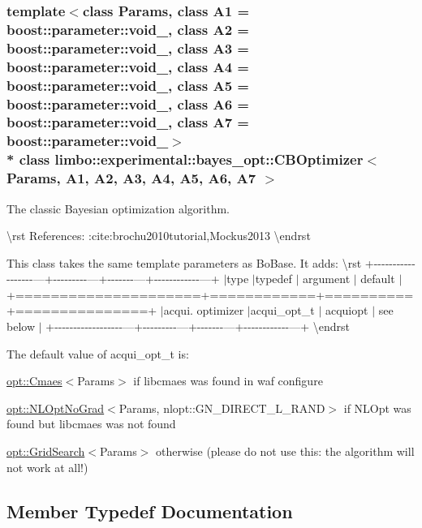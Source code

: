 \subsubsection*{template$<$class Params, class A1 = boost\+::parameter\+::void\+\_\+, class A2 = boost\+::parameter\+::void\+\_\+, class A3 = boost\+::parameter\+::void\+\_\+, class A4 = boost\+::parameter\+::void\+\_\+, class A5 = boost\+::parameter\+::void\+\_\+, class A6 = boost\+::parameter\+::void\+\_\+, class A7 = boost\+::parameter\+::void\+\_\+$>$\\*
class limbo\+::experimental\+::bayes\+\_\+opt\+::\+C\+B\+Optimizer$<$ Params, A1, A2, A3, A4, A5, A6, A7 $>$}

The classic Bayesian optimization algorithm.

\textbackslash{}rst References\+: \+:cite\+:{\ttfamily brochu2010tutorial,Mockus2013} \textbackslash{}endrst

This class takes the same template parameters as Bo\+Base. It adds\+: \textbackslash{}rst +-\/-\/-\/-\/-\/-\/-\/-\/-\/-\/-\/-\/-\/-\/-\/-\/-\/-\/---+-\/-\/-\/-\/-\/-\/-\/-\/-\/---+-\/-\/-\/-\/-\/-\/-\/---+-\/-\/-\/-\/-\/-\/-\/-\/-\/-\/-\/-\/---+ $\vert$type $\vert$typedef $\vert$ argument $\vert$ default $\vert$ +=====================+============+==========+===============+ $\vert$acqui. optimizer $\vert$acqui\+\_\+opt\+\_\+t $\vert$ acquiopt $\vert$ see below $\vert$ +-\/-\/-\/-\/-\/-\/-\/-\/-\/-\/-\/-\/-\/-\/-\/-\/-\/-\/---+-\/-\/-\/-\/-\/-\/-\/-\/-\/---+-\/-\/-\/-\/-\/-\/-\/---+-\/-\/-\/-\/-\/-\/-\/-\/-\/-\/-\/-\/---+ \textbackslash{}endrst

The default value of acqui\+\_\+opt\+\_\+t is\+:
\begin{DoxyItemize}
\item {\ttfamily \hyperlink{structlimbo_1_1opt_1_1_cmaes}{opt\+::\+Cmaes}$<$Params$>$} if libcmaes was found in {\ttfamily waf configure}
\item {\ttfamily \hyperlink{structlimbo_1_1opt_1_1_n_l_opt_no_grad}{opt\+::\+N\+L\+Opt\+No\+Grad}$<$Params, nlopt\+::\+G\+N\+\_\+\+D\+I\+R\+E\+C\+T\+\_\+\+L\+\_\+\+R\+A\+ND$>$} if N\+L\+Opt was found but libcmaes was not found
\item {\ttfamily \hyperlink{structlimbo_1_1opt_1_1_grid_search}{opt\+::\+Grid\+Search}$<$Params$>$} otherwise (please do not use this\+: the algorithm will not work at all!) 
\end{DoxyItemize}

\subsection{Member Typedef Documentation}
